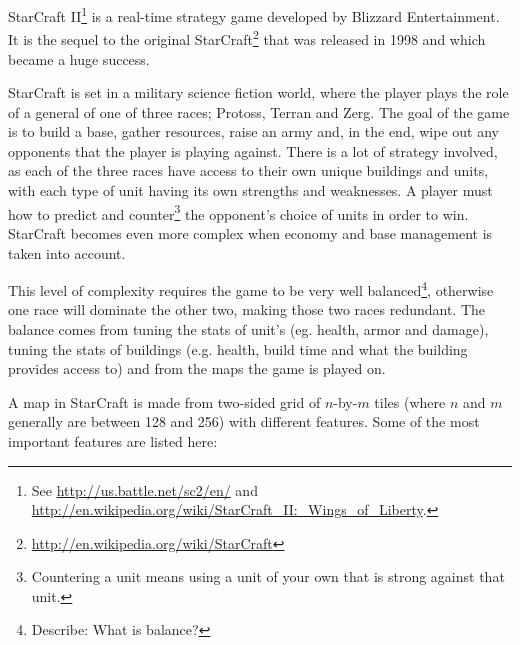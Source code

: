 StarCraft II\footnote{See \url{http://us.battle.net/sc2/en/} and \url{http://en.wikipedia.org/wiki/StarCraft_II:_Wings_of_Liberty}.} is a real-time strategy game developed by Blizzard Entertainment. It is the sequel to the original StarCraft\footnote{\url{http://en.wikipedia.org/wiki/StarCraft}} that was released in 1998 and which became a huge success.

StarCraft is set in a military science fiction world, where the player plays the role of a general of one of three races; Protoss, Terran and Zerg. The goal of the game is to build a base, gather resources, raise an army and, in the end, wipe out any opponents that the player is playing against. There is a lot of strategy involved, as each of the three races have access to their own unique buildings and units, with each type of unit having its own strengths and weaknesses. A player must how to predict and counter\footnote{Countering a unit means using a unit of your own that is strong against that unit.} the opponent's choice of units in order to win. StarCraft becomes even more complex when economy and base management is taken into account.


This level of complexity requires the game to be very well balanced\footnote{Describe: What is balance?}, otherwise one race will dominate the other two, making those two races redundant. The balance comes from tuning the stats of unit's (eg. health, armor and damage), tuning the stats of buildings (e.g. health, build time and what the building provides access to) and from the maps the game is played on.

A map in StarCraft is made from two-sided grid of $n$-by-$m$ tiles (where $n$ and $m$ generally are between 128 and 256) with different features. Some of the most important features are listed here:

